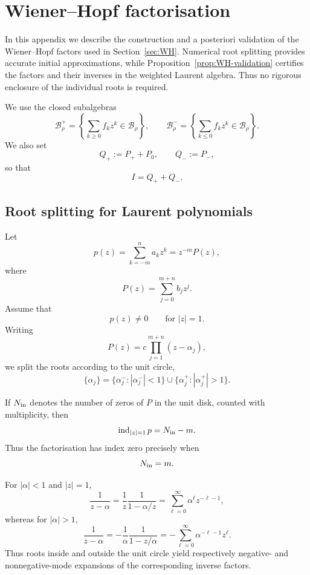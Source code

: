 \documentclass[11pt,a4paper]{amsart}
\begin{document}
\section{Wiener--Hopf factorisation}
\label{sec:appendix-WH}

In this appendix we describe the construction and a posteriori
validation of the Wiener--Hopf factors used in
Section~\ref{sec:WH}. Numerical root splitting provides accurate
initial approximations, while
Proposition~\ref{prop:WH-validation} certifies the factors and their
inverses in the weighted Laurent algebra. Thus no rigorous enclosure
of the individual roots is required.

We use the closed subalgebras
\[
\mathcal B_\rho^+
=
\left\{
\sum_{k\ge0}f_kz^k\in\mathcal B_\rho
\right\},
\qquad
\mathcal B_\rho^-
=
\left\{
\sum_{k\le0}f_kz^k\in\mathcal B_\rho
\right\}.
\]
We also set
\[
Q_+:=P_++P_0,
\qquad
Q_-:=P_-,
\]
so that
\[
I=Q_++Q_-.
\]


\subsection{Root splitting for Laurent polynomials}
\label{subsec:WH}

Let
\[
p(z)
=
\sum_{k=-m}^{n}a_kz^k
=
z^{-m}P(z),
\]
where
\[
P(z)=\sum_{j=0}^{m+n}b_jz^j.
\]
Assume that
\[
p(z)\neq0
\qquad
\text{for }|z|=1.
\]
Writing
\[
P(z)
=
c\prod_{j=1}^{m+n}(z-\alpha_j),
\]
we split the roots according to the unit circle,
\[
\{\alpha_j\}
=
\{\alpha_j^-:|\alpha_j^-|<1\}
\cup
\{\alpha_j^+:|\alpha_j^+|>1\}.
\]

If $N_{\rm in}$ denotes the number of zeros of $P$ in the unit disk,
counted with multiplicity, then
\[
\operatorname{ind}_{|z|=1}p
=
N_{\rm in}-m.
\]
Thus the factorisation has index zero precisely when
\[
N_{\rm in}=m.
\]

For $|\alpha|<1$ and $|z|=1$,
\[
\frac1{z-\alpha}
=
\frac1z\frac1{1-\alpha/z}
=
\sum_{\ell=0}^{\infty}
\alpha^\ell z^{-\ell-1},
\]
whereas for $|\alpha|>1$,
\[
\frac1{z-\alpha}
=
-\frac1\alpha\frac1{1-z/\alpha}
=
-\sum_{\ell=0}^{\infty}
\alpha^{-\ell-1}z^\ell.
\]
Thus roots inside and outside the unit circle yield respectively
negative- and nonnegative-mode expansions of the corresponding
inverse factors.
\end{document}
